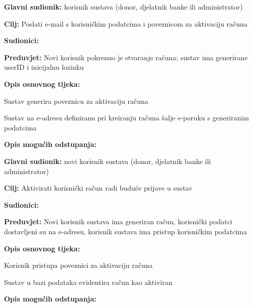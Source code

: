					\noindent {}
					\begin{packed_item} \label{UC2}
	
						\item \textbf{Glavni sudionik: } korisnik sustava (donor, djelatnik banke ili administrator)
						\item  \textbf{Cilj:} Poslati e-mail s korisničkim podatcima i poveznicom za aktivaciju računa
						\item  \textbf{Sudionici:} 
						\item  \textbf{Preduvjet:} Novi korisnik pokrenuo je stvaranje računa; sustav ima generirane userID i inicijalnu lozinku
						\item  \textbf{Opis osnovnog tijeka:}
						
						\item[] \begin{packed_enum}
	                        \item Sustav generira poveznicu za aktivaciju računa
	                        \item Sustav na e-adresu definiranu pri kreiranju računa šalje e-poruku s generiranim podatcima
						\end{packed_enum}
						
						\item  \textbf{Opis mogućih odstupanja:}
						
					\end{packed_item}
					
					
					\noindent \underbar{\textbf{UC3 - Aktiviraj svoj račun}}
					\begin{packed_item}  \label{UC3}
	
						\item \textbf{Glavni sudionik: }novi korisnik sustava (donor, djelatnik banke ili administrator)
						\item  \textbf{Cilj:} Aktivirati korisnički račun radi buduće prijave u sustav
						\item  \textbf{Sudionici:} 
						\item  \textbf{Preduvjet:} Novi korisnik sustava ima generiran račun, korisnički podatci dostavljeni su na e-adresu, korisnik sustava ima pristup korisničkim podatcima
						\item  \textbf{Opis osnovnog tijeka:}
						
						\item[] \begin{packed_enum}
	
	                        \item Korisnik pristupa poveznici za aktivaciju računa
	                        \item Sustav u bazi podataka evidentira račun kao aktiviran

						\end{packed_enum}
						
						\item  \textbf{Opis mogućih odstupanja:}
						
					\end{packed_item}
					
